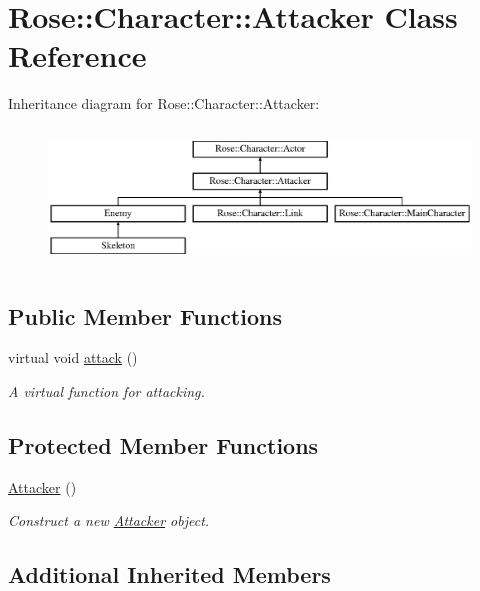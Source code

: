 \hypertarget{classRose_1_1Character_1_1Attacker}{}\section{Rose\+::Character\+::Attacker Class Reference}
\label{classRose_1_1Character_1_1Attacker}
Inheritance diagram for Rose\+::Character\+::Attacker\+:\begin{figure}[H]
\begin{center}
\leavevmode
\includegraphics[height=3.696370cm]{classRose_1_1Character_1_1Attacker}
\end{center}
\end{figure}
\subsection*{Public Member Functions}
\begin{DoxyCompactItemize}
\item 
virtual void \mbox{\hyperlink{classRose_1_1Character_1_1Attacker_a49ee8dfa04018f90c7fd5fa20ba4fcad}{attack}} ()
\begin{DoxyCompactList}\small\item\em A virtual function for attacking. \end{DoxyCompactList}\end{DoxyCompactItemize}
\subsection*{Protected Member Functions}
\begin{DoxyCompactItemize}
\item 
\mbox{\hyperlink{classRose_1_1Character_1_1Attacker_aa36b93fbee8b97bbefbf326b6042e3eb}{Attacker}} ()
\begin{DoxyCompactList}\small\item\em Construct a new \mbox{\hyperlink{classRose_1_1Character_1_1Attacker}{Attacker}} object. \end{DoxyCompactList}\end{DoxyCompactItemize}
\subsection*{Additional Inherited Members}


